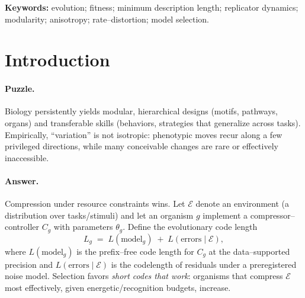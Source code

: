 \documentclass[11pt,a4paper]{article}
\begin{document}
\vspace{0.5em}
\noindent\textbf{Keywords:} evolution; fitness; minimum description length; replicator dynamics; modularity; anisotropy; rate--distortion; model selection.

\section{Introduction}

\paragraph{Puzzle.}
Biology persistently yields modular, hierarchical designs (motifs, pathways, organs) and transferable skills (behaviors, strategies that generalize across tasks). Empirically, ``variation'' is not isotropic: phenotypic moves recur along a few privileged directions, while many conceivable changes are rare or effectively inaccessible.

\paragraph{Answer.}
Compression under resource constraints wins. Let $\mathcal{E}$ denote an environment (a distribution over tasks/stimuli) and let an organism $g$ implement a compressor–controller $C_g$ with parameters $\theta_g$. Define the evolutionary code length
\begin{equation}\label{eq:Lg}
L_g \;=\; L(\text{model}_g)\;+\;L(\text{errors}\mid \mathcal{E}),
\end{equation}
where $L(\text{model}_g)$ is the prefix–free code length for $C_g$ at the data–supported precision and $L(\text{errors}\mid \mathcal{E})$ is the codelength of residuals under a preregistered noise model. Selection favors \emph{short codes that work}: organisms that compress $\mathcal{E}$ most effectively, given energetic/recognition budgets, increase.
\end{document}
